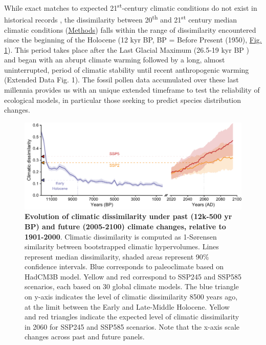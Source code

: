 \documentclass[pdflatex, sn-nature]{sn-jnl}%
\begin{document}
While exact matches to expected 21\textsuperscript{st}-century climatic conditions do not exist in historical records \cite{Burke2018}, the dissimilarity between 20\textsuperscript{th} and 21\textsuperscript{st} century median climatic conditions (\hyperref[methods]{Methods}) falls within the range of dissimilarity encountered since the beginning of the Holocene (12 kyr BP, BP = Before Present (1950), \hyperref[climatic_dissimilarity]{Fig. 1}). This period takes place after the Last Glacial Maximum (26.5-19 kyr BP \cite{Clark2009}) and began with an abrupt climate warming followed by a long, almost uninterrupted, period of climatic stability until recent anthropogenic warming (Extended Data Fig. 1). The fossil pollen data accumulated over these last millennia provides us with an unique extended timeframe to test the reliability of ecological models, in particular those seeking to predict species distribution changes. %

\begin{figure}[ht]
\centering
\hspace*{-0.6in}
\includegraphics[scale=1]{climatic_dissimilarity.pdf}
\caption{\textbf{Evolution of climatic dissimilarity under past (12k-500 yr BP) and future (2005-2100) climate changes, relative to 1901-2000}. Climatic dissimilarity is computed as 1-Sørensen similarity between bootstrapped climatic hypervolumes. Lines represent median dissimilarity, shaded areas represent 90\% confidence intervals. Blue corresponds to paleoclimate based on HadCM3B model. Yellow and red correspond to SSP245 and SSP585 scenarios, each based on 30 global climate models. The blue triangle on y-axis indicates the level of climatic dissimilarity 8500 years ago, at the limit between the Early and Late-Middle Holocene. Yellow and red triangles indicate the expected level of climatic dissimilarity in 2060 for SSP245 and SSP585 scenarios. Note that the x-axis scale changes across past and future panels.}\label{climatic_dissimilarity}
\end{figure} %
\end{document}
